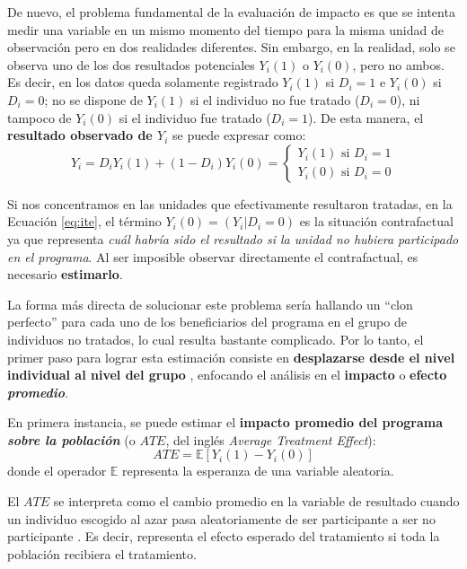 \documentclass[../../main.tex]{subfiles}
\begin{document}
De nuevo, el problema fundamental de la evaluación de impacto es que se intenta medir una
variable en un mismo momento del tiempo para la misma unidad de observación pero en dos
realidades diferentes. Sin embargo, en la realidad, solo se observa uno de los dos resultados
potenciales \(Y_i(1)\) o \(Y_i(0)\), pero no ambos. Es decir, en los datos queda solamente
registrado \(Y_i(1)\) si \(D_i=1\) e \(Y_i(0)\) si \(D_i=0\); no se dispone de \(Y_i(1)\)
si el individuo no fue tratado (\(D_i=0\)), ni tampoco de \(Y_i(0)\) si el individuo fue
tratado (\(D_i=1\)). De esta manera, el \textbf{resultado observado de \(Y_i\)} se puede
expresar como:
\begin{equation}
    Y_i = D_i Y_i(1) + (1-D_i)Y_i(0) =
    \begin{cases}
        Y_i(1) \text{ si } D_i=1 \\
        Y_i(0) \text{ si } D_i=0
    \end{cases}
    \label{eq:observed-result}
\end{equation}

Si nos concentramos en las unidades que efectivamente resultaron tratadas, en la Ecuación
\ref{eq:ite}, el término \(Y_i(0) = (Y_i|D_i=0)\) es la situación contrafactual ya que
representa \textit{cuál habría sido el resultado si la unidad no hubiera participado en el
programa}. Al ser imposible observar directamente el contrafactual, es necesario
\textbf{estimarlo}.

La forma más directa de solucionar este problema sería hallando un ``clon perfecto'' para
cada uno de los beneficiarios del programa en el grupo de individuos no tratados, lo cual
resulta bastante complicado. Por lo tanto, el primer paso para lograr esta estimación
consiste en \textbf{desplazarse desde el nivel individual al nivel del grupo}
\cite{gertler-2016}, enfocando el análisis en el \textbf{impacto} o \textbf{efecto
\textit{promedio}}.

En primera instancia, se puede estimar el \textbf{impacto promedio del programa
\textit{sobre la población}} (o \(ATE\), del inglés \textit{Average Treatment Effect}):
\begin{equation}
    ATE = \mathbb{E}\left[Y_i(1)-Y_i(0)\right]
\end{equation}
donde el operador \(\mathbb{E}\) representa la esperanza de una variable aleatoria.

El \(ATE\) se interpreta como el cambio promedio en la variable de resultado cuando un
individuo escogido al azar pasa aleatoriamente de ser participante a ser no participante
\cite{bernal}. Es decir, representa el efecto esperado del tratamiento si toda la
población recibiera el tratamiento.
\end{document}
